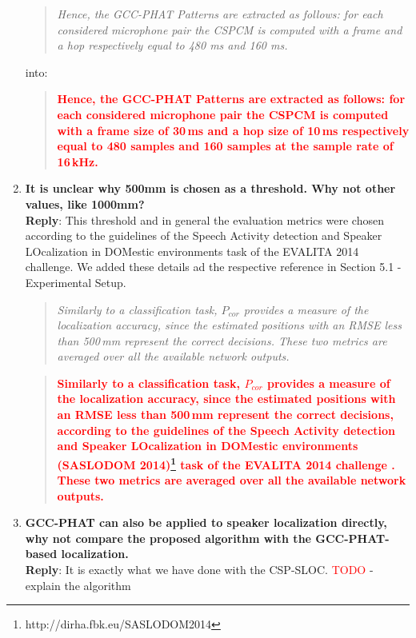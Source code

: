 \documentclass[11pt, technote, letterpaper, oneside, onecolumn]{IEEEtran}
\begin{document}
\begin{enumerate}
\begin{quote}
	\textit{Hence, the GCC-PHAT Patterns are extracted as follows: for each considered microphone pair the CSPCM is computed with a frame and a hop respectively equal to 480 ms and 160 ms.}
\end{quote}
into:
\begin{quote}
	\textcolor{red}{\textbf{Hence, the GCC-PHAT Patterns are extracted as follows: for each considered microphone pair the CSPCM is computed with a frame size of 30\,ms and a hop size of 10\,ms respectively equal to 480 samples and 160 samples at the sample rate of 16\,kHz.}}
\end{quote}


\item  \textbf{It is unclear why 500mm is chosen as a threshold. Why not other values, like 1000mm?\\}
\textbf{Reply}: This threshold and in general the evaluation metrics were chosen according to the guidelines of the Speech Activity detection and Speaker LOcalization in DOMestic environments task of the EVALITA 2014 challenge. We added these details ad the respective reference in Section 5.1 - Experimental Setup.
\begin{quote}
	\textit{Similarly to a classification task, $P_{cor}$ provides a measure of the localization accuracy, since the estimated positions with an RMSE less than 500\,mm represent the correct decisions. These two metrics are averaged over all the available network outputs.}
\end{quote}

\begin{quote}
	\textcolor{red}{\textbf{Similarly to a classification task, $P_{cor}$ provides a measure of the localization accuracy, since the estimated positions with an RMSE less than 500\,mm represent the correct decisions, according to the guidelines of the Speech Activity detection and Speaker LOcalization in DOMestic environments (SASLODOM 2014)\footnote{http://dirha.fbk.eu/SASLODOM2014} task of the EVALITA 2014 challenge \cite{basili2014proceedings}. These two metrics are averaged over all the available network outputs.}}
\end{quote}

\item  \textbf{GCC-PHAT can also be applied to speaker localization directly, why not compare the proposed algorithm with the GCC-PHAT-based localization. \\}
\textbf{Reply}:  It is exactly what we have done with the CSP-SLOC. \textcolor{red}{TODO} - explain the algorithm


\end{enumerate}
\end{document}

